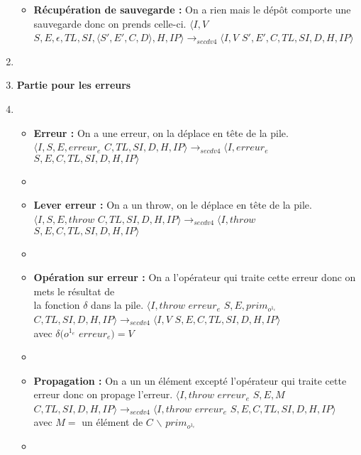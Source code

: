 \documentclass[10pt,a4paper]{article}
\begin{document}
\begin{enumerate}
\begin{itemize}
					\item[] \textbf{Récupération de sauvegarde :}  On a rien mais le dépôt comporte une sauvegarde donc on prends celle-ci.
					\smallbreak  
					$\langle I,V$ $S,E,\epsilon,TL,SI,\langle S',E',C,D\rangle,H,IP\rangle
					\longrightarrow_{secdv4} \langle I,V$ $S',E',C,TL,SI,D,H,IP\rangle$
				\end{itemize}
				\item[]
				
				
				
				\item[] \textbf{Partie pour les erreurs} 
				\item[]
				\begin{itemize}
					\item[] \textbf{Erreur :} On a une erreur, on la déplace en tête de la pile.
					\smallbreak
					$\langle I,S,E,erreur_{e}$ $C,TL,SI,D,H,IP\rangle
					\longrightarrow_{secdv4} \langle I,erreur_{e}$ $S,E,C,TL,SI,D,H,IP\rangle$
					\item[]
					
					\item[] \textbf{Lever erreur :} On a un throw, on le déplace en tête de la pile.
					\smallbreak
					$\langle I,S,E,throw$ $C,TL,SI,D,H,IP\rangle
					\longrightarrow_{secdv4} \langle I,throw$ $S,E,C,TL,SI,D,H,IP\rangle$
					\item[]
					
					\item[] \textbf{Opération sur erreur :} On a l'opérateur qui traite cette erreur donc on mets le résultat de 
					\\la fonction $\delta$ dans la pile.
					\smallbreak
					$\langle I,throw$ $erreur_{e}$ $S,E,prim_{o^{1_{e}}}$ $C,TL,SI,D,H,IP\rangle
					\longrightarrow_{secdv4} \langle I,V$ $S,E,C,TL,SI,D,H,IP\rangle$
					\\ avec $\delta(o^{1_{e}}$ $erreur_{e}) = V$
					\item[]
					
					\item[] \textbf{Propagation :} On a un un élément excepté l'opérateur qui traite cette erreur donc on propage l'erreur.
					\smallbreak
					$\langle I,throw$ $erreur_{e}$ $S,E,M$ $C,TL,SI,D,H,IP\rangle
					\longrightarrow_{secdv4} \langle I,throw$ $erreur_{e}$ $S,E,C,TL,SI,D,H,IP\rangle$ 
					\\avec $M = $ un élément de $C$ $\backslash$ $prim_{o^{1_{e}}}$
					\item[]
					

\end{itemize}
\end{enumerate}
\end{document}

